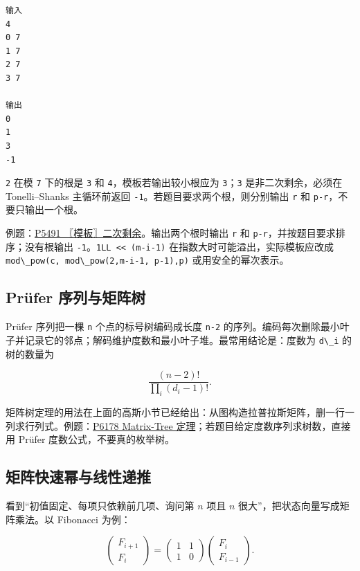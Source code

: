 \begin{lstlisting}
输入
4
0 7
1 7
2 7
3 7

输出
0
1
3
-1
\end{lstlisting}

\passthrough{\lstinline!2!} 在模 \passthrough{\lstinline!7!} 下的根是 \passthrough{\lstinline!3!} 和 \passthrough{\lstinline!4!}，模板若输出较小根应为 \passthrough{\lstinline!3!}；\passthrough{\lstinline!3!} 是非二次剩余，必须在 Tonelli--Shanks 主循环前返回 \passthrough{\lstinline!-1!}。若题目要求两个根，则分别输出 \passthrough{\lstinline!r!} 和 \passthrough{\lstinline!p-r!}，不要只输出一个根。

例题：\href{https://www.luogu.com.cn/problem/P5491}{P5491 〖模板〗二次剩余}。输出两个根时输出 \passthrough{\lstinline!r!} 和 \passthrough{\lstinline!p-r!}，并按题目要求排序；没有根输出 \passthrough{\lstinline!-1!}。\passthrough{\lstinline!1LL << (m-i-1)!} 在指数大时可能溢出，实际模板应改成 \passthrough{\lstinline!mod\_pow(c, mod\_pow(2,m-i-1, p-1),p)!} 或用安全的幂次表示。


\subsection{Prüfer 序列与矩阵树}

Prüfer 序列把一棵 \passthrough{\lstinline!n!} 个点的标号树编码成长度 \passthrough{\lstinline!n-2!} 的序列。编码每次删除最小叶子并记录它的邻点；解码维护度数和最小叶子堆。最常用结论是：度数为 \passthrough{\lstinline!d\_i!} 的树的数量为

\[\frac{(n-2)!}{\prod_i(d_i-1)!}.\]

矩阵树定理的用法在上面的高斯小节已经给出：从图构造拉普拉斯矩阵，删一行一列求行列式。例题：\href{https://www.luogu.com.cn/problem/P6178}{P6178 Matrix-Tree 定理}；若题目给定度数序列求树数，直接用 Prüfer 度数公式，不要真的枚举树。


\subsection{矩阵快速幂与线性递推}

看到``初值固定、每项只依赖前几项、询问第 \(n\) 项且 \(n\) 很大''，把状态向量写成矩阵乘法。以 Fibonacci 为例：

\[
\begin{pmatrix}F_{i+1}\\F_i\end{pmatrix}
=
\begin{pmatrix}1&1\\1&0\end{pmatrix}
\begin{pmatrix}F_i\\F_{i-1}\end{pmatrix}.
\]

